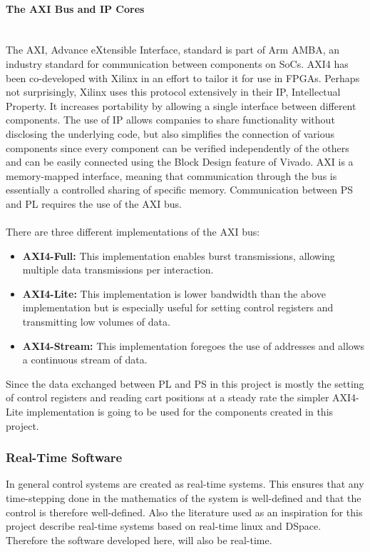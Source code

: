 \paragraph{The AXI Bus and IP Cores}~\\ %
\label{par:the_axi_bus}
The AXI, Advance eXtensible Interface, standard is part of Arm AMBA, an industry standard for communication between components on SoCs.
AXI4 has been co-developed with Xilinx in an effort to tailor it for use in FPGAs.
Perhaps not surprisingly, Xilinx uses this protocol extensively in their IP, Intellectual Property.
It increases portability by allowing a single interface between different components.
The use of IP allows companies to share functionality without disclosing the underlying code, but also simplifies the connection of various components since every component can be verified independently of the others and can be easily connected using the Block Design feature of Vivado.
AXI is a memory-mapped interface, meaning that communication through the bus is essentially a controlled sharing of specific memory.
Communication between PS and PL requires the use of the AXI bus.
\\~\\
There are three different implementations of the AXI bus:
\begin{itemize}
	\item \textbf{AXI4-Full:} This implementation enables burst transmissions, allowing multiple data transmissions per interaction.
	\item \textbf{AXI4-Lite:} This implementation is lower bandwidth than the above implementation but is especially useful for setting control registers and transmitting low volumes of data.
	\item \textbf{AXI4-Stream:} This implementation foregoes the use of addresses and allows a continuous stream of data.
\end{itemize}
Since the data exchanged between PL and PS in this project is mostly the setting of control registers and reading cart positions at a steady rate the simpler AXI4-Lite implementation is going to be used for the components created in this project.
\subsubsection{Real-Time Software} %
\label{ssub:real_time}
In general control systems are created as real-time systems.
This ensures that any time-stepping done in the mathematics of the system is well-defined and that the control is therefore well-defined.
Also the literature used as an inspiration for this project \cite{invertpendulum1} \cite{doubleinvertpendulum} \cite{tripleinvertpendulum} describe real-time systems based on real-time linux and DSpace.
Therefore the software developed here, will also be real-time.

